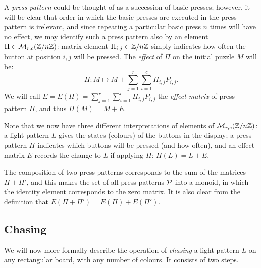 A {\it press pattern} could be thought of as a succession of 
basic presses; however, it will be clear that order in which the
basic presses are executed in the press pattern is irelevant, and since 
repeating a particular basic press $n$ times will have no effect,
we may identify such a press pattern also by an element 
$\Pi\in\mathcal{M}_{r,c}(\mathbb{Z}/n\mathbb{Z})$:
matrix element $\Pi_{i,j}\in\mathbb{Z}/n\mathbb{Z}$ simply indicates how often the button
at position $i, j$ will be pressed. The {\it effect} of $\Pi$ on the initial
puzzle $M$ will be:
$$\Pi:M\mapsto M+\sum_{j=1}^r\sum_{i=1}^c \Pi_{i, j}P_{i, j}.$$
We will call $E=E(\Pi)=\sum_{j=1}^r\sum_{i=1}^c \Pi_{i, j}P_{i, j}$ the
{\it effect-matrix} of press pattern $\Pi$, and thus
$\Pi(M)=M+E$.

Note that we now have three different interpretations of elements
of $\mathcal{M}_{r,c}(\mathbb{Z}/n\mathbb{Z})$: a light pattern $L$ gives the states (colours)
of the buttons in the display; a press pattern $\Pi$ indicates which buttons
will be pressed (and how often), and an effect matrix $E$ records
the change to $L$ if applying $\Pi$:
$\Pi(L)=L+E$.

The composition of two press patterns 
corresponds to the sum of the matrices $\Pi+\Pi'$, and this makes 
the set of all press patterns $\cal P$ into a monoid,
in which the identity element corresponds to the zero matrix.
It is also clear from the definition that $E(\Pi+\Pi')=E(\Pi)+E(\Pi')$.
\subsection*{Chasing}
We will now more formally describe the operation of {\it chasing}
a light pattern $L$ on any rectangular board, with any number
of colours. It consists of two steps.

